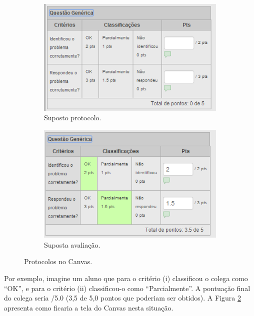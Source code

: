 \documentclass[12pt,a4paper,oneside]{article}
\begin{document}
\begin{figure}[htb]
	\centering
	\begin{subfigure}[b]{0.4\textwidth}
		\centering
		\includegraphics[width=\textwidth]{imagens/supostoProtocolo.png}
		\caption{Suposto protocolo.}
		\label{supProt}
	\end{subfigure}
	\begin{subfigure}[b]{0.4\textwidth}
		\centering
		\includegraphics[width=\textwidth]{imagens/supostaAvaliacao.png}
		\caption{Suposta avaliação.}
		\label{supAval}
	\end{subfigure}
	\caption{Protocolos no {\sf Canvas}.}
	\label{sup}
\end{figure}

Por exemplo, imagine um aluno que para o critério (i) classificou o colega como ``OK'', e para o critério (ii) classificou-o como ``Parcialmente''. A pontuação final do colega seria {/5.0} (3,5 de 5,0 pontos que poderiam ser obtidos). A Figura \ref{supAval} apresenta como ficaria a tela do {\sf Canvas} nesta situação.
\end{document}
